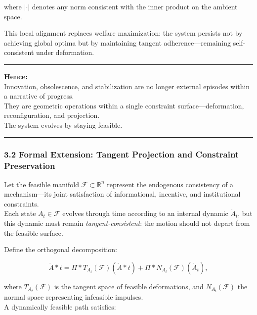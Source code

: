 \documentclass[11pt]{article}
\begin{document}
where \(|\cdot|\) denotes any norm consistent with the inner product on
the ambient space.

This local alignment replaces welfare maximization: the system persists
not by achieving global optima but by maintaining tangent
adherence---remaining self-consistent under deformation.

\begin{center}\rule{0.5\linewidth}{0.5pt}\end{center}

\textbf{Hence:}\\
Innovation, obsolescence, and stabilization are no longer external
episodes within a narrative of progress.\\
They are geometric operations within a single constraint
surface---deformation, reconfiguration, and projection.\\
The system evolves by staying feasible.

\begin{center}\rule{0.5\linewidth}{0.5pt}\end{center}

\subsubsection{\texorpdfstring{3.2 \textbf{Formal Extension: Tangent
Projection and Constraint
Preservation}}{3.2 Formal Extension: Tangent Projection and Constraint Preservation}}\label{formal-extension-tangent-projection-and-constraint-preservation}

Let the feasible manifold \(\mathcal{F} \subset \mathbb{R}^n\) represent
the endogenous consistency of a mechanism---its joint satisfaction of
informational, incentive, and institutional constraints.\\
Each state \(A_t \in \mathcal{F}\) evolves through time according to an
internal dynamic \(\dot{A}_t\), but this dynamic must remain
\emph{tangent-consistent}: the motion should not depart from the
feasible surface.

Define the orthogonal decomposition:

\[
\dot{A}*t = \Pi*{T_{A_t}(\mathcal{F})}(\dot{A}*t) + \Pi*{N_{A_t}(\mathcal{F})}(\dot{A}_t),
\]

where \(T_{A_t}(\mathcal{F})\) is the tangent space of feasible
deformations, and \(N_{A_t}(\mathcal{F})\) the normal space representing
infeasible impulses.\\
A dynamically feasible path satisfies:
\end{document}

